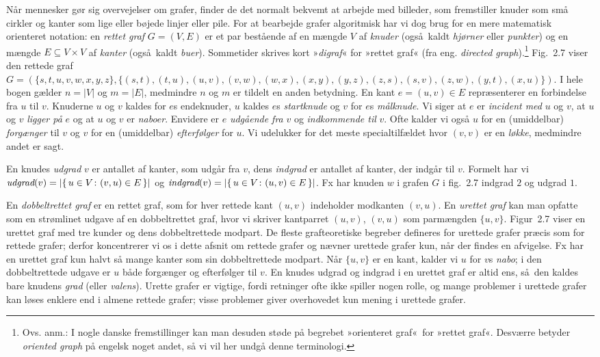 Når mennesker gør sig overvejelser om grafer, finder de det normalt bekvemt at arbejde med billeder, som fremstiller knuder som små cirkler og kanter som lige eller bøjede linjer eller pile.
For at bearbejde grafer algoritmisk har vi dog brug for en mere matematisk orienteret notation:
en \emph{rettet graf} $G=(V,E)$ er et par bestående af en mængde $V$ af \emph{knuder} (også kaldt \emph{hjørner} eller \emph{punkter}) og en mængde $E\subseteq V\times V$ af \emph{kanter} (også kaldt \emph{buer}).
Sommetider skrives kort »\emph{digraf}« for »rettet graf« (fra eng. \emph{directed graph}).\footnote{%
  Ovs. anm.: I nogle danske fremstillinger kan man desuden støde på begrebet »orienteret graf« for »rettet graf«.
  Desværre betyder \emph{oriented graph} på engelsk noget andet, så vi vil her undgå denne terminologi.}
Fig.~2.7 viser den rettede graf $G=(\{s,t,u,v,w,x,y,z\},\{(s,t), (t,u), (u,v), (v,w), \allowbreak (w,x), \allowbreak (x,y),\allowbreak  (y,z), (z,s),  (s,v), (z,w), (y,t), (x, u)\})$.
I hele bogen gælder $n=|V|$ og $m=|E|$, medmindre $n$ og $m$ er tildelt en anden betydning.
En kant $e=(u,v)\in E$ repræsenterer en forbindelse fra $u$ til $v$.
Knuderne $u$ og $v$ kaldes for $e$s endeknuder, $u$ kaldes $e$s \emph{startknude} og $v$ for $e$s \emph{målknude}.
Vi siger at $e$ er \emph{incident med} $u$ og $v$, at $u$ og $v$ \emph{ligger på} $e$ og at $u$ og $v$ er \emph{naboer}.
Envidere er $e$ \emph{udgående fra} $v$ og \emph{indkommende til} $v$.
Ofte kalder vi også $u$ for en (umiddelbar) \emph{forgænger} til $v$ og $v$ for en (umiddelbar) \emph{efterfølger} for $u$.
Vi udelukker for det meste specialtilfældet hvor $(v,v)$ er en \emph{løkke}, medmindre andet er sagt.

En knudes \emph{udgrad} $v$ er antallet af kanter, som udgår fra $v$, dens \emph{indgrad} er antallet af kanter, der indgår til $v$. 
Formelt har vi 
$\operatorname{\emph{udgrad}}(v)=|\{\,u\in V\colon (v,u)\in E\,\}|$ og
$\operatorname{\emph{indgrad}}(v)=|\{\,u\in V\colon (u,v)\in E\,\}|$.
Fx har knuden $w$ i grafen $G$ i fig.~2.7 indgrad $2$ og udgrad $1$.

En \emph{dobbeltrettet graf} er en rettet graf, som for hver rettede kant $(u,v)$ indeholder modkanten $(v,u)$.
En \emph{urettet graf} kan man opfatte som en strømlinet udgave af en dobbeltrettet graf, hvor vi skriver kantparret $(u,v)$, $(v,u)$ som parmængden $\{u,v\}$.
Figur~2.7 viser en urettet graf med tre kunder og dens dobbeltrettede modpart.
De fleste grafteoretiske begreber defineres for urettede grafer præcis som for rettede grafer; derfor koncentrerer vi os i dette afsnit om rettede grafer og nævner urettede grafer kun, når der findes en afvigelse.
Fx har en urettet graf kun halvt så mange kanter som sin dobbeltrettede modpart.
Når $\{u,v\}$ er en kant, kalder vi $u$ for $v$s \emph{nabo}; i den dobbeltrettede udgave er $u$ både forgænger og efterfølger til $v$.
En knudes udgrad og indgrad i en urettet graf er altid ens, så den kaldes bare knudens \emph{grad} (eller \emph{valens}).
Urette grafer er vigtige, fordi retninger ofte ikke spiller nogen rolle, og mange problemer i urettede grafer kan løses enklere end i almene rettede grafer; visse problemer giver overhovedet kun mening i urettede grafer.


